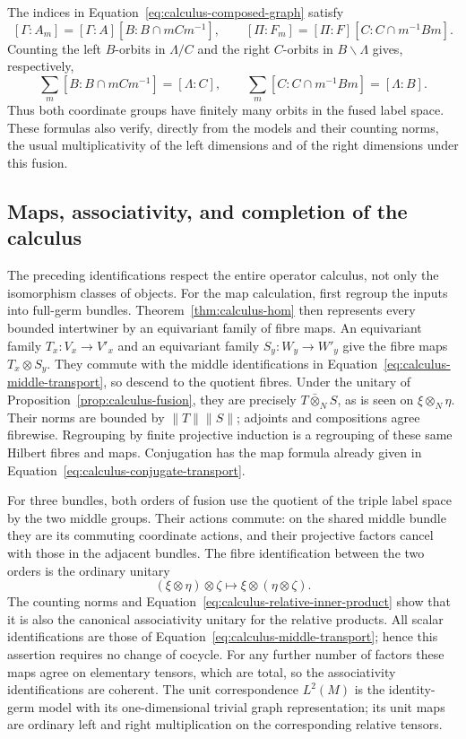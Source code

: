 The indices in Equation~\eqref{eq:calculus-composed-graph} satisfy
\[
 [\Gamma:A_m]=[\Gamma:A][B:B\cap mCm^{-1}],
 \qquad
 [\Pi:F_m]=[\Pi:F][C:C\cap m^{-1}Bm].
\]
Counting the left $B$-orbits in $\Lambda/C$ and the right $C$-orbits
in $B\backslash\Lambda$ gives, respectively,
\[
 \sum_m[B:B\cap mCm^{-1}]=[\Lambda:C],
 \qquad
 \sum_m[C:C\cap m^{-1}Bm]=[\Lambda:B].
\]
Thus both coordinate groups have finitely many orbits in the fused
label space.  These formulas also verify, directly from the models
and their counting norms, the usual multiplicativity of the left
dimensions and of the right dimensions under this fusion.

\subsection{Maps, associativity, and completion of the calculus}

The preceding identifications respect the entire operator calculus,
not only the isomorphism classes of objects.  For the map calculation,
first regroup the inputs into full-germ bundles.
Theorem~\ref{thm:calculus-hom} then represents every bounded intertwiner
by an equivariant family of fibre maps.  An equivariant family
$T_x:V_x\to V'_x$ and an equivariant family $S_y:W_y\to W'_y$
give the fibre maps $T_x\otimes S_y$.  They commute with the
middle identifications in Equation~\eqref{eq:calculus-middle-transport},
so descend to the quotient fibres.  Under the unitary of
Proposition~\ref{prop:calculus-fusion}, they are precisely
$T\mathbin{\bar\otimes}_N S$, as is seen on
$\xi\otimes_N\eta$.  Their norms are bounded by $\|T\|\|S\|$;
adjoints and compositions agree fibrewise.  Regrouping by finite
projective induction is a regrouping of these same Hilbert fibres
and maps.  Conjugation has the map formula already given in
Equation~\eqref{eq:calculus-conjugate-transport}.

For three bundles, both orders of fusion use the quotient of the
triple label space by the two middle groups.  Their actions commute:
on the shared middle bundle they are its commuting coordinate
actions, and their projective factors cancel with those in the
adjacent bundles.  The fibre identification between the two orders
is the ordinary unitary
\[
 (\xi\otimes\eta)\otimes\zeta
       \longmapsto\xi\otimes(\eta\otimes\zeta).
\]
The counting norms and Equation~\eqref{eq:calculus-relative-inner-product}
show that it is also the canonical associativity unitary for the
relative products.  All scalar identifications are those of
Equation~\eqref{eq:calculus-middle-transport}; hence this assertion
requires no change of cocycle.  For any further number of factors
these maps agree on elementary tensors, which are total, so the
associativity identifications are coherent.  The unit correspondence
$L^2(M)$ is the identity-germ model with its one-dimensional trivial
graph representation; its unit maps are ordinary left and right
multiplication on the corresponding relative tensors.

